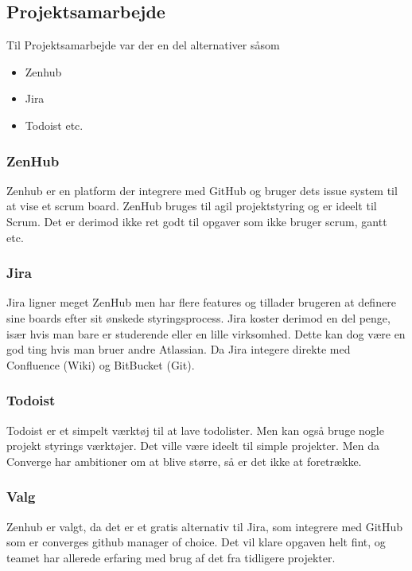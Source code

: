 \subsection{Projektsamarbejde}

Til Projektsamarbejde var der en del alternativer såsom

\begin{itemize}
    \item Zenhub
    \item Jira
    \item Todoist etc.
\end{itemize}

\subsubsection{ZenHub}

Zenhub er en platform der integrere med GitHub og bruger dets issue system til at vise et scrum board. ZenHub bruges til agil projektstyring og er ideelt til Scrum. Det er derimod ikke ret godt til opgaver som ikke bruger scrum, gantt etc.

\subsubsection{Jira}

Jira ligner meget ZenHub men har flere features og tillader brugeren at definere sine boards efter sit ønskede styringsprocess. Jira koster derimod en del penge, især hvis man bare er studerende eller en lille virksomhed. Dette kan dog være en god ting hvis man bruer andre Atlassian. Da Jira integere direkte med Confluence (Wiki) og BitBucket (Git).

\subsubsection{Todoist}

Todoist er et simpelt værktøj til at lave todolister. Men kan også bruge nogle projekt styrings værktøjer. Det ville være ideelt til simple projekter. Men da Converge har ambitioner om at blive større, så er det ikke at foretrække.

\subsubsection{Valg}

Zenhub er valgt, da det er et gratis alternativ til Jira, som integrere med GitHub som er converges github manager of choice. Det vil klare opgaven helt fint, og teamet har allerede erfaring med brug af det fra tidligere projekter.



